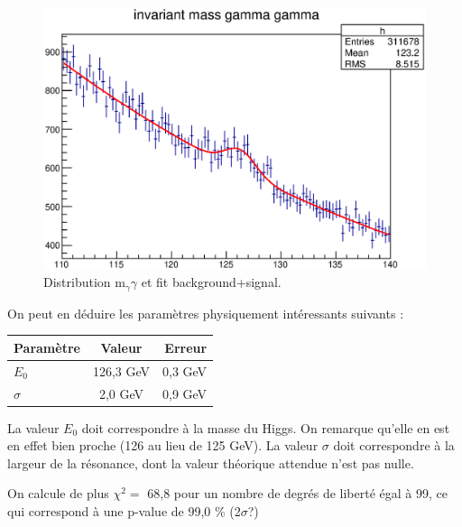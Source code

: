 \documentclass[11pt]{article} %
\begin{document}
\begin{figure}[H]
  \caption{Distribution m$_\gamma \gamma$ et fit background+signal. }
\includegraphics{../graphes/mgg_30GeV}
\end{figure}

On peut en déduire les paramètres physiquement intéressants suivants :

\begin{tabular}{|l|c|r|} 
   \hline
   Paramètre & Valeur & Erreur \\
    \hline
   $E_0$ & 126,3 GeV & 0,3 GeV\\
  \hline
   $\sigma$ & 2,0 GeV & 0,9 GeV \\
  \hline
\end{tabular}

La valeur $E_0$ doit correspondre à la masse du Higgs. On remarque qu'elle en est en effet bien proche (126 au lieu de 125 GeV). La valeur $\sigma$ doit correspondre à la largeur de la résonance, dont la valeur théorique attendue n'est pas nulle.

On calcule de plus $\chi^2 = $ 68,8 pour un nombre de degrés de liberté égal à 99, ce qui correspond à une p-value de 99,0 \% (2$\sigma$?)
\end{document}
